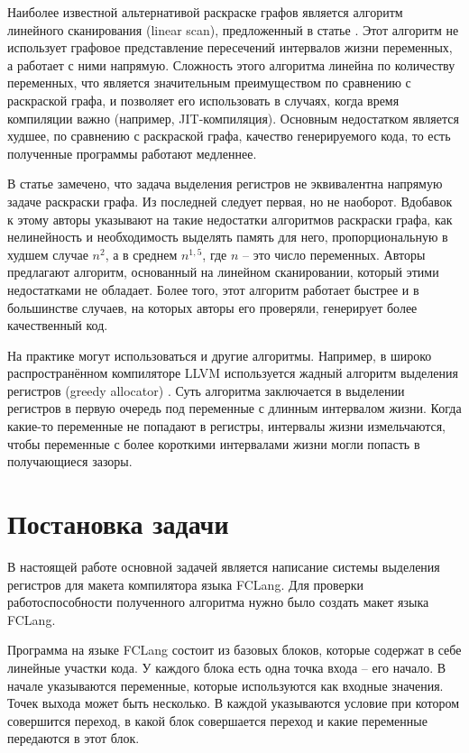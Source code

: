 \documentclass[a4paper,14pt]{extarticle}
\begin{document}
Наиболее известной альтернативой раскраске графов является алгоритм линейного сканирования (linear scan), предложенный в статье \cite{poletto_linear_1999}.
Этот алгоритм не использует графовое представление пересечений интервалов жизни переменных, а работает с ними напрямую.
Сложность этого алгоритма линейна по количеству переменных, что является значительным преимуществом по сравнению с раскраской графа,
и позволяет его использовать в случаях, когда время компиляции важно (например, JIT-компиляция).
Основным недостатком является худшее, по сравнению с раскраской графа, качество генерируемого кода, то есть полученные программы работают медленнее.

В статье \cite{krishnamurthi_extended_2007} замечено, что задача выделения регистров не эквивалентна напрямую задаче раскраски графа.
Из последней следует первая, но не наоборот.
Вдобавок к этому авторы указывают на такие недостатки алгоритмов раскраски графа,
как нелинейность и необходимость выделять память для него,
пропорциональную в худшем случае $n^2$, а в среднем $n^{1,5}$, где $n$ -- это число переменных.
Авторы предлагают алгоритм, основанный на линейном сканировании, который этими недостатками не обладает.
Более того, этот алгоритм работает быстрее и в большинстве случаев, на которых авторы его проверяли, генерирует более качественный код.

На практике могут использоваться и другие алгоритмы.
Например, в широко распространённом компиляторе LLVM используется жадный алгоритм выделения регистров (greedy allocator) \cite{llvm_greedy_2011}.
Суть алгоритма заключается в выделении регистров в первую очередь под переменные с длинным интервалом жизни.
Когда какие-то переменные не попадают в регистры, интервалы жизни измельчаются, чтобы переменные с более короткими интервалами жизни могли попасть в получающиеся зазоры.


\section{Постановка задачи}

В настоящей работе основной задачей является написание системы выделения регистров для макета компилятора языка FCLang.
Для проверки работоспособности полученного алгоритма нужно было создать макет языка FCLang.

Программа на языке FCLang состоит из базовых блоков, которые содержат в себе линейные участки кода.
У каждого блока есть одна точка входа -- его начало.
В начале указываются переменные, которые используются как входные значения.
Точек выхода может быть несколько.
В каждой указываются условие при котором совершится переход, в какой блок совершается переход и какие переменные передаются в этот блок.
\end{document}
